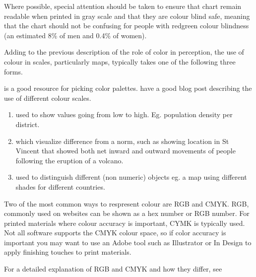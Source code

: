 \documentclass[letterpaper,10pt,english]{jupyterBook}
\begin{document}
\sphinxAtStartPar
Where possible, special attention should be taken to ensure that chart remain readable when printed in gray scale and that they are colour blind safe, meaning that the chart should not be confusing for people with red\sphinxhyphen{}green colour blindness (an estimated 8\% of men and 0.4\% of women).

\sphinxAtStartPar
Adding to the previous description of the role of color in perception, the use of colour in scales, particularly maps, typically takes one of the following three forms.%
\begin{footnote}[5]\sphinxAtStartFootnote
{} is a good resource for picking color palettes.  have a good blog post describing the use of different colour scales.
%
\end{footnote}
\begin{enumerate}
%
\item {} 
\sphinxAtStartPar
{}  used to show values going from low to high. Eg. population density per district.

\item {} 
\sphinxAtStartPar
{}   which visualize difference from a norm, such as  showing location in St Vincent that showed both net inward and outward movements of people following the eruption of a volcano.

\item {} 
\sphinxAtStartPar
{} used to distinguish different (non numeric) objects eg. a map using different shades for different countries.

\end{enumerate}

\sphinxAtStartPar
Two of the most common ways to respresent colour are RGB and CMYK. RGB, commonly used on websites can be shown as a hex number or RGB number. For printed materials where colour accuracy is important, CYMK is typically used. Not all software supports the CMYK colour space, so if color accuracy is important you may want to use an Adobe tool such as Illustrator or In Design to apply finishing touches to print materials.%
\begin{footnote}[6]\sphinxAtStartFootnote
For a detailed explanation of RGB and CMYK and how they differ, see 
%
\end{footnote}
\end{document}
